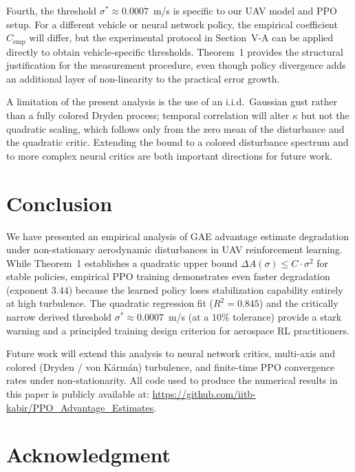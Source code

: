 \documentclass[10pt, conference]{IEEEtran}
\begin{document}
Fourth, the threshold $\sigma^* \approx 0.0007$~m/s is specific to our UAV
model and PPO setup. For a different vehicle or neural network policy,
the empirical coefficient $C_{\text{emp}}$ will differ, but the
experimental protocol in Section~V-A can be applied directly to obtain
vehicle-specific thresholds. Theorem~1 provides the structural
justification for the measurement procedure, even though policy divergence
adds an additional layer of non-linearity to the practical error growth.

A limitation of the present analysis is the use of an i.i.d.\ Gaussian gust 
rather than a fully colored Dryden process;
temporal correlation will alter $\kappa$ but not the quadratic scaling,
which follows only from the zero mean of the disturbance and the
quadratic critic. Extending the bound to a colored disturbance spectrum
and to more complex neural critics are both important directions for future work.

\section{Conclusion}

We have presented an empirical analysis of GAE advantage estimate
degradation under non-stationary aerodynamic disturbances in UAV
reinforcement learning. While Theorem~1 establishes a quadratic upper bound
$\Delta A(\sigma) \leq C\cdot\sigma^2$ for stable policies, empirical PPO
training demonstrates even faster degradation (exponent $3.44$) because
the learned policy loses stabilization capability entirely at high turbulence.
The quadratic regression fit ($R^2 = 0.845$) and the critically narrow derived
threshold $\sigma^* \approx 0.0007$~m/s (at a $10\%$ tolerance) provide a stark
warning and a principled training design criterion for aerospace RL practitioners.

Future work will extend this analysis to neural network critics,
multi-axis and colored (Dryden / von K\'{a}rm\'{a}n) turbulence, and
finite-time PPO convergence rates under non-stationarity. All code used
to produce the numerical results in this paper is publicly available at:
\url{https://github.com/iitb-kabir/PPO_Advantage_Estimates}.

\section*{Acknowledgment}
\end{document}
